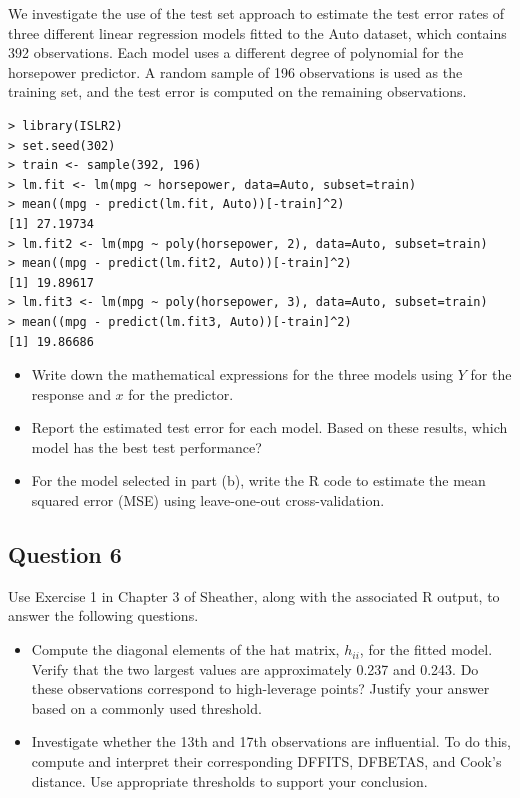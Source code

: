 We investigate the use of the test set approach to estimate the test error rates of three different linear regression models fitted to the Auto dataset, which contains 392 observations. Each model uses a different degree of polynomial for the horsepower predictor. A random sample of 196 observations is used as the training set, and the test error is computed on the remaining observations.

\begin{verbatim}
> library(ISLR2)
> set.seed(302)
> train <- sample(392, 196)
> lm.fit <- lm(mpg ~ horsepower, data=Auto, subset=train)
> mean((mpg - predict(lm.fit, Auto))[-train]^2)
[1] 27.19734
> lm.fit2 <- lm(mpg ~ poly(horsepower, 2), data=Auto, subset=train)
> mean((mpg - predict(lm.fit2, Auto))[-train]^2)
[1] 19.89617
> lm.fit3 <- lm(mpg ~ poly(horsepower, 3), data=Auto, subset=train)
> mean((mpg - predict(lm.fit3, Auto))[-train]^2)
[1] 19.86686
\end{verbatim}

\begin{itemize}
\item[(a)] Write down the mathematical expressions for the three models using $Y$ for the response and $x$ for the predictor.

\item[(b)] Report the estimated test error for each model. Based on these results, which model has the best test performance?

\item[(c)] For the model selected in part (b), write the R code to estimate the mean squared error (MSE) using leave-one-out cross-validation.
\end{itemize}

\clearpage

\subsection{Question 6}

Use Exercise 1 in Chapter 3 of Sheather, along with the associated R output, to answer the following questions.

\begin{itemize}
\item[(a)] Compute the diagonal elements of the hat matrix, $h_{ii}$, for the fitted model. Verify that the two largest values are approximately 0.237 and 0.243. Do these observations correspond to high-leverage points? Justify your answer based on a commonly used threshold.

\item[(b)] Investigate whether the 13th and 17th observations are influential. To do this, compute and interpret their corresponding DFFITS, DFBETAS, and Cook's distance. Use appropriate thresholds to support your conclusion.
\end{itemize}

